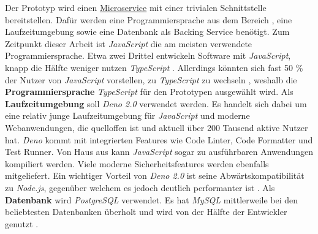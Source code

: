 Der Prototyp wird einen \hyperref[sec:02-02_microservices]{Microservice} mit einer trivialen Schnittstelle bereitstellen. Dafür werden eine Programmiersprache aus dem Bereich , eine Laufzeitumgebung sowie eine Datenbank als Backing Service benötigt. Zum Zeitpunkt dieser Arbeit ist \textit{JavaScript} die am meisten verwendete Programmiersprache. Etwa zwei Drittel entwickeln Software mit \textit{JavaScript}, knapp die Hälfte weniger nutzen \textit{TypeScript} \cite{206:Developer-Survey-2024,207:Developer-Ecosystem}. Allerdings könnten sich fast 50 \% der Nutzer von \textit{JavaScript} vorstellen, zu \textit{TypeScript} zu wechseln \cite{206:Developer-Survey-2024}, weshalb die \textbf{Programmiersprache} \textit{TypeScript} für den Prototypen ausgewählt wird. Als \textbf{Laufzeitumgebung} soll \textit{Deno 2.0} verwendet werden. Es handelt sich dabei um eine relativ junge Laufzeitumgebung für \textit{JavaScript} und moderne Webanwendungen, die quelloffen ist und aktuell über 200 Tausend aktive Nutzer hat. \textit{Deno} kommt mit integrierten Features wie Code Linter, Code Formatter und Test Runner. Von Haus aus kann \textit{JavaScript} sogar zu ausführbaren Anwendungen kompiliert werden. Viele moderne Sicherheitsfeatures werden ebenfalls mitgeliefert. Ein wichtiger Vorteil von \textit{Deno 2.0} ist seine Abwärtskompatibilität zu \textit{Node.js}, gegenüber welchem es jedoch deutlich performanter ist \cite{309:Deno}. Als \textbf{Datenbank} wird \textit{PostgreSQL} verwendet. Es hat \textit{MySQL} mittlerweile bei den beliebtesten Datenbanken überholt und wird von der Hälfte der Entwickler genutzt \cite{206:Developer-Survey-2024}.
